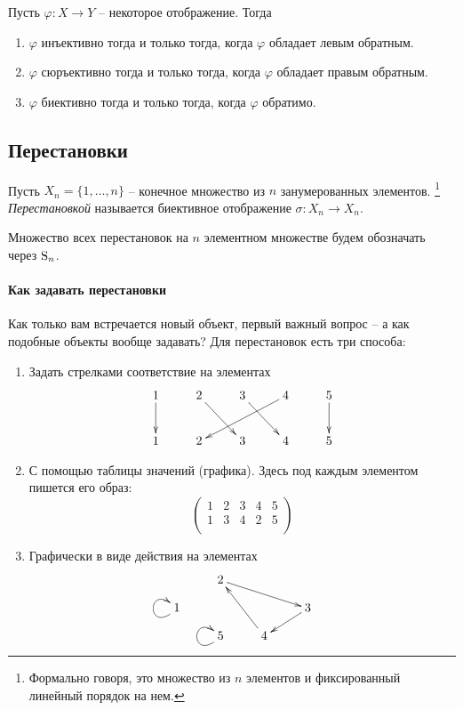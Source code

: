 \begin{claim*}
Пусть $\varphi\colon X\to Y$ -- некоторое отображение.
Тогда
\begin{enumerate}
\item $\varphi$ инъективно тогда и только тогда, когда $\varphi$ обладает левым обратным.

\item $\varphi$ сюръективно тогда и только тогда, когда $\varphi$ обладает правым обратным.

\item $\varphi$ биективно тогда и только тогда, когда $\varphi$ обратимо.
\end{enumerate}
\end{claim*}

\subsection{Перестановки}

\begin{definition}
\label{def::Perm}
Пусть $X_n = \{1,\ldots,n\}$ -- конечное множество из $n$ занумерованных элементов.%
\footnote{Формально говоря, это множество из $n$ элементов и фиксированный линейный порядок на нем.}
{\it Перестановкой} называется биективное отображение $\sigma\colon X_n\to X_n$.
\end{definition}
Множество всех перестановок на $n$ элементном множестве будем обозначать через $\operatorname{S}_{n}$.


\paragraph{Как задавать перестановки}

Как только вам встречается новый объект, первый важный вопрос -- а как подобные объекты вообще задавать?
Для перестановок есть три способа:
\begin{enumerate}
\item Задать стрелками соответствие на элементах
\[
\xymatrix{
	{1}\ar[d]&{2}\ar[dr]&{3}\ar[dr]&{4}\ar[dll]&{5}\ar[d]\\
	{1}&{2}&{3}&{4}&{5}
}
\]

\item С помощью таблицы значений (графика).
Здесь под каждым элементом пишется его образ:
\[
\begin{pmatrix}
{1}&{2}&{3}&{4}&{5}\\
{1}&{3}&{4}&{2}&{5}\\
\end{pmatrix}
\]

\item Графически в виде действия на элементах
\[
\xymatrix@R=10pt{
	{}&{2}\ar[rrd]&{}&{}\\
	{1}\ar@(dl,ul)&{}&{}&{3}\ar[dl]\\
	{}&{5}\ar@(dl,ul)&{4}\ar[luu]&{}
}
\]
\end{enumerate}

